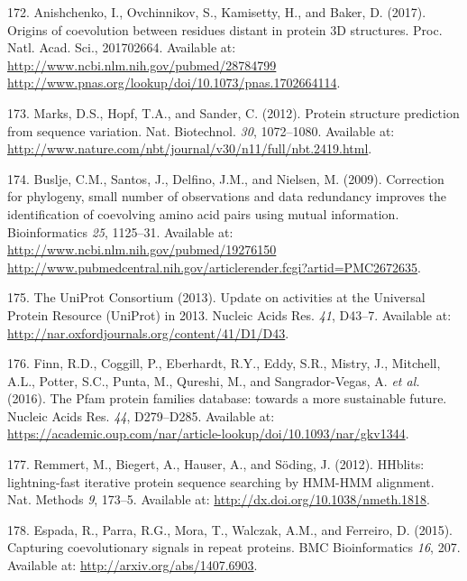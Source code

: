 \documentclass[11pt,a4paper,twoside]{book}
\theoremstyle{definition}
\theoremstyle{definition}
\theoremstyle{remark}
\begin{document}
\hypertarget{ref-Anishchenko2017}{}
172. Anishchenko, I., Ovchinnikov, S., Kamisetty, H., and Baker, D.
(2017). Origins of coevolution between residues distant in protein 3D
structures. Proc. Natl. Acad. Sci., 201702664. Available at:
\href{http://www.ncbi.nlm.nih.gov/pubmed/28784799\%20http://www.pnas.org/lookup/doi/10.1073/pnas.1702664114}{http://www.ncbi.nlm.nih.gov/pubmed/28784799 http://www.pnas.org/lookup/doi/10.1073/pnas.1702664114}.

\hypertarget{ref-Marks2012}{}
173. Marks, D.S., Hopf, T.A., and Sander, C. (2012). Protein structure
prediction from sequence variation. Nat. Biotechnol. \emph{30},
1072--1080. Available at:
\url{http://www.nature.com/nbt/journal/v30/n11/full/nbt.2419.html}.

\hypertarget{ref-Buslje2009}{}
174. Buslje, C.M., Santos, J., Delfino, J.M., and Nielsen, M. (2009).
Correction for phylogeny, small number of observations and data
redundancy improves the identification of coevolving amino acid pairs
using mutual information. Bioinformatics \emph{25}, 1125--31. Available
at:
\href{http://www.ncbi.nlm.nih.gov/pubmed/19276150\%20http://www.pubmedcentral.nih.gov/articlerender.fcgi?artid=PMC2672635}{http://www.ncbi.nlm.nih.gov/pubmed/19276150 http://www.pubmedcentral.nih.gov/articlerender.fcgi?artid=PMC2672635}.

\hypertarget{ref-TheUniProtConsortium2013}{}
175. The UniProt Consortium (2013). Update on activities at the
Universal Protein Resource (UniProt) in 2013. Nucleic Acids Res.
\emph{41}, D43--7. Available at:
\url{http://nar.oxfordjournals.org/content/41/D1/D43}.

\hypertarget{ref-Finn2016}{}
176. Finn, R.D., Coggill, P., Eberhardt, R.Y., Eddy, S.R., Mistry, J.,
Mitchell, A.L., Potter, S.C., Punta, M., Qureshi, M., and
Sangrador-Vegas, A. \emph{et al.} (2016). The Pfam protein families
database: towards a more sustainable future. Nucleic Acids Res.
\emph{44}, D279--D285. Available at:
\url{https://academic.oup.com/nar/article-lookup/doi/10.1093/nar/gkv1344}.

\hypertarget{ref-Remmert2012}{}
177. Remmert, M., Biegert, A., Hauser, A., and Söding, J. (2012).
HHblits: lightning-fast iterative protein sequence searching by HMM-HMM
alignment. Nat. Methods \emph{9}, 173--5. Available at:
\url{http://dx.doi.org/10.1038/nmeth.1818}.

\hypertarget{ref-Espada2014}{}
178. Espada, R., Parra, R.G., Mora, T., Walczak, A.M., and Ferreiro, D.
(2015). Capturing coevolutionary signals in repeat proteins. BMC
Bioinformatics \emph{16}, 207. Available at:
\url{http://arxiv.org/abs/1407.6903}.
\end{document}
